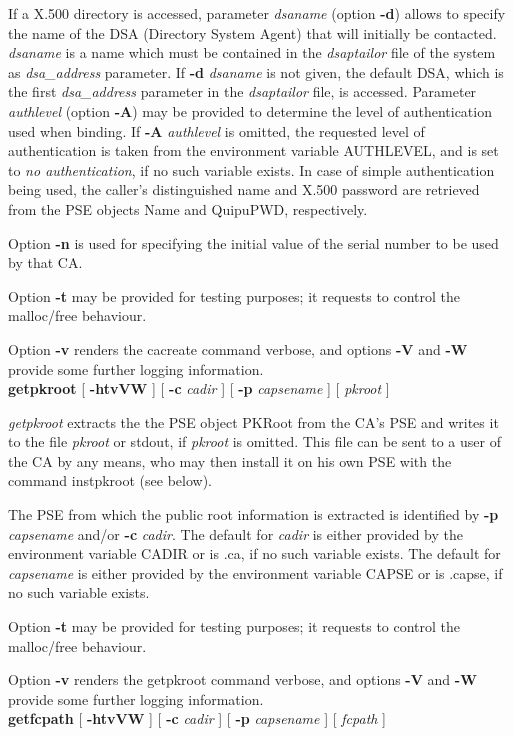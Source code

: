 If a X.500 directory is accessed, parameter {\em dsaname} (option {\bf -d}) allows to specify 
the name of the DSA (Directory System Agent) that
will initially be contacted. {\em dsaname} is a name which must be contained in the 
{\em dsaptailor} file of the system as {\em dsa\_address} parameter. If {\bf -d} {\em dsaname} is
not given, the default DSA, which is the first {\em dsa\_address} parameter in the {\em dsaptailor} 
file, is accessed. 
Parameter {\em authlevel} (option {\bf -A}) may be provided to determine the level of authentication used when binding. If {\bf -A} {\em authlevel} is omitted, the requested 
level of authentication is taken from the environment variable AUTHLEVEL, and is set to {\em no 
authentication}, if no such variable exists.
In case of simple authentication being used, the caller's distinguished name and
X.500 password are retrieved from the PSE objects Name and QuipuPWD, respectively.

Option {\bf -n} is used for specifying the initial value of the serial number to be used by that CA.
 
Option {\bf -t} may be provided for testing purposes; it requests to control the malloc/free behaviour.

Option {\bf -v} renders the cacreate command verbose, and options {\bf -V} and {\bf -W} provide some further logging information.
\\ [1em]
{\bf getpkroot} [ {\bf -htvVW} ] [ {\bf -c} {\em cadir} ] [ {\bf -p} {\em capsename} ] [ {\em pkroot} ]

{\em getpkroot} extracts the the PSE object PKRoot from the CA's PSE
and writes it to the file {\em pkroot} or stdout, if {\em pkroot} is omitted. 
This file can be sent to a user of the CA by any means,
who may then install it on his own PSE with the command instpkroot (see below). 
 
The PSE from which the public root information is extracted is identified by {\bf -p} {\em capsename} and/or
{\bf -c} {\em cadir}. 
The default for {\em cadir} is either provided by the environment variable
CADIR or is .ca, if no such variable exists.
The default for {\em capsename} is either provided by the environment variable
CAPSE or is .capse, if no such variable exists.

Option {\bf -t} may be provided for testing purposes; it requests to control the malloc/free behaviour.

Option {\bf -v} renders the getpkroot command verbose, and options {\bf -V} and {\bf -W} provide some further logging information.
\\ [1em]
{\bf getfcpath} [ {\bf -htvVW} ] [ {\bf -c} {\em cadir} ] [ {\bf -p} {\em capsename} ] [ {\em fcpath} ]

